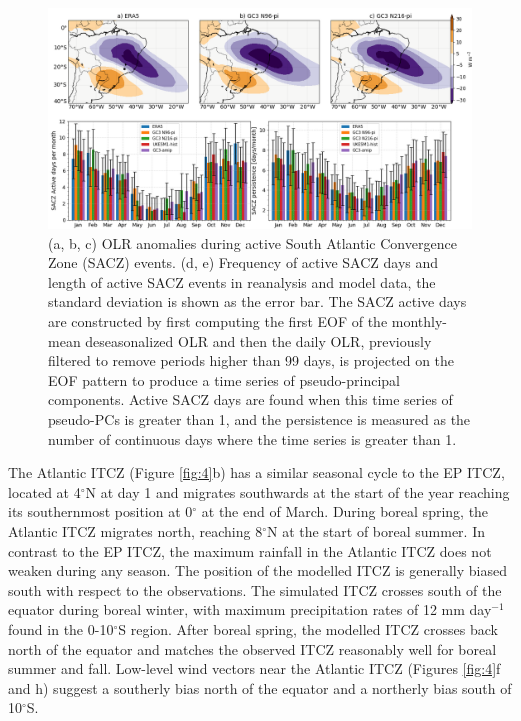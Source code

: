 \begin{figure}[b!]
\includegraphics[width=\linewidth]{figures/saczanalysis.png}
\caption[SACZ assessment in UKESM1 and HadGEM3]{(a, b, c) OLR anomalies during active South Atlantic Convergence Zone (SACZ) events. (d, e) Frequency of active SACZ days and length of active SACZ events in reanalysis and model data, the standard deviation is shown as the error bar. The SACZ active days are constructed by first computing the first EOF of the monthly-mean deseasonalized OLR and then the daily OLR, previously filtered to remove periods higher than 99 days, is projected on the EOF pattern to produce a time series of pseudo-principal components. Active SACZ days are found when this time series of pseudo-PCs is greater than 1, and the persistence is measured as the number of continuous days where the time series is greater than 1.}
\label{fig:sacz}
\end{figure}

The Atlantic ITCZ (Figure \ref{fig:4}b) has a similar seasonal cycle to the EP ITCZ, located at 4$^\circ$N at day 1 and migrates southwards at the start of the year reaching  its southernmost position at 0$^\circ$ at the end of March.
During boreal spring, the Atlantic ITCZ migrates north, reaching 8$^\circ$N at the start of boreal summer. In contrast to the EP ITCZ, the maximum rainfall in the Atlantic ITCZ does not weaken during any season. 
The position of the modelled ITCZ is generally biased south with respect to the observations.
The simulated ITCZ  crosses south of the equator during boreal winter, with maximum precipitation rates of 12 mm day$^{-1}$ found in the 0-10$^\circ$S region.
After boreal spring, the modelled ITCZ crosses back north of the equator and matches the observed ITCZ reasonably well for boreal summer and fall.
Low-level wind vectors near the Atlantic ITCZ (Figures \ref{fig:4}f and h) suggest a southerly bias north of the equator and a northerly bias south of 10$^\circ$S.

